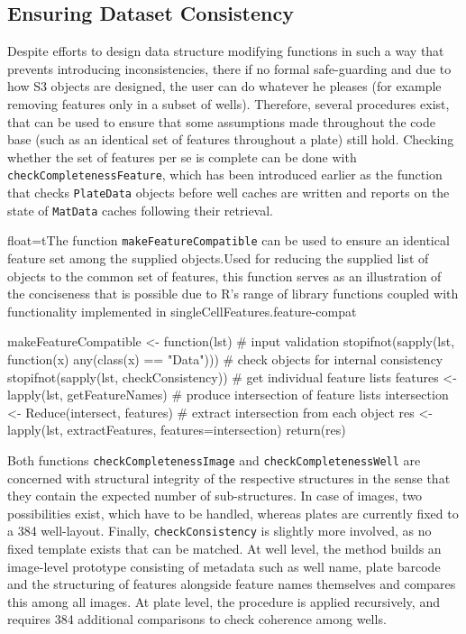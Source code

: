 \subsection{Ensuring Dataset Consistency}
Despite efforts to design data structure modifying functions in such a way that prevents introducing inconsistencies, there if no formal safe-guarding and due to how S3 objects are designed, the user can do whatever he pleases (for example removing features only in a subset of wells). Therefore, several procedures exist, that can be used to ensure that some assumptions made throughout the code base (such as an identical set of features throughout a plate) still hold. Checking whether the set of features per se is complete can be done with \texttt{checkCompletenessFeature}, which has been introduced earlier as the function that checks \texttt{PlateData} objects before well caches are written and reports on the state of \texttt{MatData} caches following their retrieval.

\begin{rlisting}{float=t}{The function \texttt{makeFeatureCompatible} can be used to ensure an identical feature set among the supplied objects.}{Used for reducing the supplied list of objects to the common set of features, this function serves as an illustration of the conciseness that is possible due to R's range of library functions coupled with functionality implemented in singleCellFeatures.}{feature-compat}
\begin{rcode}
makeFeatureCompatible <- function(lst) {
  # input validation
  stopifnot(sapply(lst, function(x) any(class(x) == "Data")))
  # check objects for internal consistency
  stopifnot(sapply(lst, checkConsistency))
  # get individual feature lists
  features <- lapply(lst, getFeatureNames)
  # produce intersection of feature lists
  intersection <- Reduce(intersect, features)
  # extract intersection from each object
  res <- lapply(lst, extractFeatures, features=intersection)
  return(res)
}
\end{rcode}
\end{rlisting}

Both functions \texttt{checkCompletenessImage} and \texttt{checkCompletenessWell} are concerned with structural integrity of the respective structures in the sense that they contain the expected number of sub-structures. In case of images, two possibilities exist, which have to be handled, whereas plates are currently fixed to a 384 well-layout. Finally, \texttt{checkConsistency} is slightly more involved, as no fixed template exists that can be matched. At well level, the method builds an image-level prototype consisting of metadata such as well name, plate barcode and the structuring of features alongside feature names themselves and compares this among all images. At plate level, the procedure is applied recursively, and requires 384 additional comparisons to check coherence among wells.

